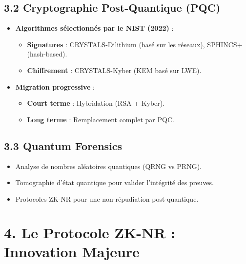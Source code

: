 \documentclass[12pt, a4paper]{report}
\begin{document}
\subsection*{3.2 Cryptographie Post-Quantique (PQC)}
\begin{itemize}
    \item \textbf{Algorithmes sélectionnés par le NIST (2022)} :
    \begin{itemize}
        \item \textbf{Signatures} : CRYSTALS-Dilithium (basé sur les réseaux), SPHINCS+ (hash-based).
        \item \textbf{Chiffrement} : CRYSTALS-Kyber (KEM basé sur LWE).
    \end{itemize}
    \item \textbf{Migration progressive} :
    \begin{itemize}
        \item \textbf{Court terme} : Hybridation (RSA + Kyber).
        \item \textbf{Long terme} : Remplacement complet par PQC.
    \end{itemize}
\end{itemize}

\subsection*{3.3 Quantum Forensics}
\begin{itemize}
    \item Analyse de nombres aléatoires quantiques (QRNG vs PRNG).
    \item Tomographie d’état quantique pour valider l’intégrité des preuves.
    \item Protocoles ZK-NR pour une non-répudiation post-quantique.
\end{itemize}

\section*{4. Le Protocole ZK-NR : Innovation Majeure}
\end{document}
